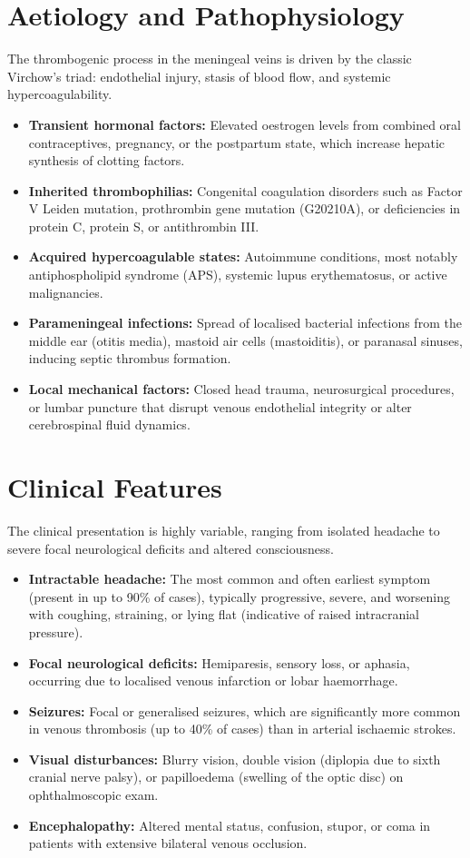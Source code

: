 \section*{Aetiology and Pathophysiology}
The thrombogenic process in the meningeal veins is driven by the classic Virchow's triad: endothelial injury, stasis of blood flow, and systemic hypercoagulability.
\begin{itemize}
    \item \textbf{Transient hormonal factors:} Elevated oestrogen levels from combined oral contraceptives, pregnancy, or the postpartum state, which increase hepatic synthesis of clotting factors.
    \item \textbf{Inherited thrombophilias:} Congenital coagulation disorders such as Factor V Leiden mutation, prothrombin gene mutation (G20210A), or deficiencies in protein C, protein S, or antithrombin III.
    \item \textbf{Acquired hypercoagulable states:} Autoimmune conditions, most notably antiphospholipid syndrome (APS), systemic lupus erythematosus, or active malignancies.
    \item \textbf{Parameningeal infections:} Spread of localised bacterial infections from the middle ear (otitis media), mastoid air cells (mastoiditis), or paranasal sinuses, inducing septic thrombus formation.
    \item \textbf{Local mechanical factors:} Closed head trauma, neurosurgical procedures, or lumbar puncture that disrupt venous endothelial integrity or alter cerebrospinal fluid dynamics.
\end{itemize}

\section*{Clinical Features}
The clinical presentation is highly variable, ranging from isolated headache to severe focal neurological deficits and altered consciousness.
\begin{itemize}
    \item \textbf{Intractable headache:} The most common and often earliest symptom (present in up to 90\% of cases), typically progressive, severe, and worsening with coughing, straining, or lying flat (indicative of raised intracranial pressure).
    \item \textbf{Focal neurological deficits:} Hemiparesis, sensory loss, or aphasia, occurring due to localised venous infarction or lobar haemorrhage.
    \item \textbf{Seizures:} Focal or generalised seizures, which are significantly more common in venous thrombosis (up to 40\% of cases) than in arterial ischaemic strokes.
    \item \textbf{Visual disturbances:} Blurry vision, double vision (diplopia due to sixth cranial nerve palsy), or papilloedema (swelling of the optic disc) on ophthalmoscopic exam.
    \item \textbf{Encephalopathy:} Altered mental status, confusion, stupor, or coma in patients with extensive bilateral venous occlusion.
\end{itemize}

